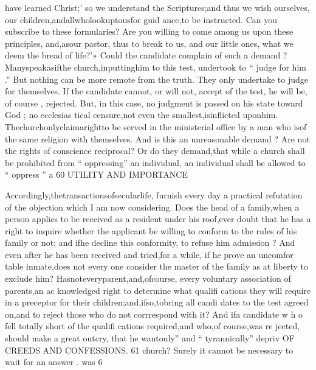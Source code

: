 \documentclass[
]{book}
\begin{document}
have learned Christ;' so we understand the Scriptures;and thus we wish ourselves, our
children,andallwholookuptousfor guid ance,to be instructed. Can you subscribe to these formularies? Are you willing to come
among us upon these principles, and,asour pastor, thus to break to us, and our little ones, what we deem the bread of life?'» Could
the candidate complain of such a demand ? Manyspeakasifthe church,inputtinghim to this test, undertook to `` judge for him .'' But nothing can be more remote from the truth. They only undertake to judge for
themselves. If the candidate cannot, or will
not, accept of the test, he will be, of course ,
rejected. But, in this case, no judgment is
passed on his state toward God ; no ecclesias
tical censure,not even the smallest,isinflicted
uponhim. Thechurchonlyclaimarightto
be served in the ministerial office by a man
who isof the same religion with themselves. And is this an unreasonable demand ? Are
not the rights of conscience reciprocal? Or do they demand,that while a church shall be
prohibited from `` oppressing'' an individual, an individual shall be allowed to `` oppress '' a
60 UTILITY AND IMPORTANCE

Accordingly,thetransactionsofsecularlife, furnish every day a practical refutation of the
objection which I am now considering. Does the head of a family,when a person applies to
be received as a resident under his roof,ever doubt that he has a right to inquire whether
the applicant be willing to conform to the rules of his family or not; and ifhe decline
this conformity, to refuse him admission ? And even after he has been received and
tried,for a while, if he prove an uncomfor table inmate,does not every one consider the master of the family as at liberty to exclude him? Hasnoteveryparent,and,ofcourse, every voluntary association of parents,an ac
knowledged right to determine what qualifi cations they will require in a preceptor for their children;and,ifso,tobring all candi dates to the test agreed on,and to reject those who do not corrrespond with it? And ifa candidate w h o fell totally short of the qualifi cations required,and who,of course,was re jected, should make a great outcry, that he
wantonly'' and `` tyrannically'' depriv
OF CREEDS AND CONFESSIONS. 61
church? Surely it cannot be necessary to wait for an answer .
was
6
\end{document}
